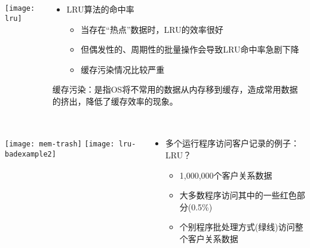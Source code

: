 \begin{frame}[plain]
	\frametitle{ }
	\begin{columns}
		\begin{column}{.4\textwidth}
			\centering
			\texttt{[image: lru]}
		\end{column}
		
		\begin{column}{.6\textwidth}
			
			\begin{itemize}\Large
				\item LRU算法的命中率
				\begin{itemize}\large
					
					\item 当存在“热点”数据时，LRU的效率很好
					\item 但偶发性的、周期性的批量操作会导致LRU命中率急剧下降
					\item 缓存污染情况比较严重
					
				\end{itemize}
			\end{itemize}
			\small
			缓存污染：是指OS将不常用的数据从内存移到缓存，造成常用数据的挤出，降低了缓存效率的现象。
		\end{column}
		
		
	\end{columns}
\end{frame}


\begin{frame}[plain]
	\frametitle{ }
	\begin{columns}
		\begin{column}{.5\textwidth}
			\centering
			\texttt{[image: mem-trash]}
			\texttt{[image: lru-badexample2]}
			
		\end{column}
		
		\begin{column}{.5\textwidth}
			
			\begin{itemize}
				\item 多个运行程序访问客户记录的例子：LRU？
				\begin{itemize}
					\item 1,000,000个客户关系数据
					\item 大多数程序访问其中的一些红色部分(0.5\%)
					\item 个别程序批处理方式(绿线)访问整个客户关系数据
					
				\end{itemize}
			\end{itemize}
			
		\end{column}
		
		
	\end{columns}
\end{frame}

